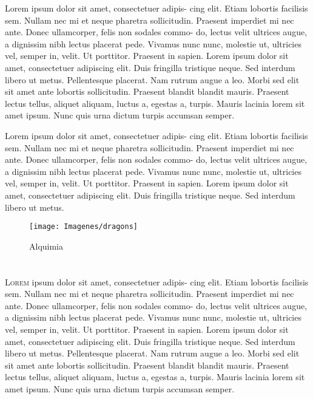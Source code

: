 \documentclass[12pt,twoside]{book}
\newcommand{\traps}[5]{
		\lettrine[
			image=true,
			lines=5,
			nindent=2pt,
			depth=#1,
			lraise=#2,
			loversize=#3
			]
			{#4}{\color{black}#5}
		}
\begin{document}
Lorem ipsum dolor sit amet, consectetuer adipis- cing elit. Etiam lobortis facilisis sem. Nullam nec mi et neque pharetra sollicitudin. Praesent imperdiet mi nec ante. Donec ullamcorper, felis non sodales commo- do, lectus velit ultrices augue, a dignissim nibh lectus placerat pede. Vivamus nunc nunc, molestie ut, ultricies vel, semper in, velit. Ut porttitor. Praesent in sapien. Lorem ipsum dolor sit amet, consectetuer adipiscing elit. Duis fringilla tristique neque. Sed interdum libero ut metus. Pellentesque placerat. Nam rutrum augue a leo. Morbi sed elit sit amet ante lobortis sollicitudin. Praesent blandit blandit mauris. Praesent lectus tellus, aliquet aliquam, luctus a, egestas a, turpis. Mauris lacinia lorem sit amet ipsum. Nunc quis urna dictum turpis accumsan semper.

Lorem ipsum dolor sit amet, consectetuer adipis- cing elit. Etiam lobortis facilisis sem. Nullam nec mi et neque pharetra sollicitudin. Praesent imperdiet mi nec ante. Donec ullamcorper, felis non sodales commo- do, lectus velit ultrices augue, a dignissim nibh lectus placerat pede. Vivamus nunc nunc, molestie ut, ultricies vel, semper in, velit. Ut porttitor. Praesent in sapien. Lorem ipsum dolor sit amet, consectetuer adipiscing elit. Duis fringilla tristique neque. Sed interdum libero ut metus.

\vfill
\begin{figure}[h]
	\texttt{[image: Imagenes/dragons]}
	\caption{Alquimia}
\end{figure}


\chapter{}
\traps{0}{-0.025}{0.05}{L}{orem}
ipsum dolor sit amet, consectetuer adipis- cing elit. Etiam lobortis facilisis sem. Nullam nec mi et neque pharetra sollicitudin. Praesent imperdiet mi nec ante. Donec ullamcorper, felis non sodales commo- do, lectus velit ultrices augue, a dignissim nibh lectus placerat pede. Vivamus nunc nunc, molestie ut, ultricies vel, semper in, velit. Ut porttitor. Praesent in sapien. Lorem ipsum dolor sit amet, consectetuer adipiscing elit. Duis fringilla tristique neque. Sed interdum libero ut metus. Pellentesque placerat. Nam rutrum augue a leo. Morbi sed elit sit amet ante lobortis sollicitudin. Praesent blandit blandit mauris. Praesent lectus tellus, aliquet aliquam, luctus a, egestas a, turpis. Mauris lacinia lorem sit amet ipsum. Nunc quis urna dictum turpis accumsan semper.
\end{document}
